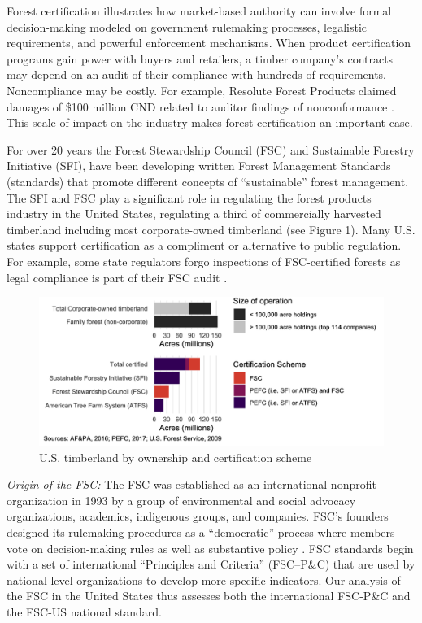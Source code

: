 \documentclass[
      12pt,
            Review ]{article}
\begin{document}
Forest certification illustrates how market-based authority can involve formal decision-making modeled on government rulemaking processes, legalistic requirements, and powerful enforcement mechanisms. When product certification programs gain power with buyers and retailers, a timber company's contracts may depend on an audit of their compliance with hundreds of requirements. Noncompliance may be costly. For example, Resolute Forest Products claimed damages of \$100 million CND related to auditor findings of nonconformance \citep{Tigar2017}. This scale of impact on the industry makes forest certification an important case.

For over 20 years the Forest Stewardship Council (FSC) and Sustainable Forestry Initiative (SFI), have been developing written Forest Management Standards (standards) that promote different concepts of ``sustainable'' forest management. The SFI and FSC play a significant role in regulating the forest products industry in the United States, regulating a third of commercially harvested timberland including most corporate-owned timberland (see Figure 1). Many U.S. states support certification as a compliment or alternative to public regulation. For example, some state regulators forgo inspections of FSC-certified forests as legal compliance is part of their FSC audit \citep{Judge-Lord2013}.

\begin{figure}
\centering
\includegraphics{../Figs/acres-1.png}
\caption{U.S. timberland by ownership and certification scheme}
\end{figure}

\emph{Origin of the FSC:} The FSC was established as an international nonprofit organization in 1993 by a group of environmental and social advocacy organizations, academics, indigenous groups, and companies. FSC's founders designed its rulemaking procedures as a ``democratic'' process where members vote on decision-making rules as well as substantive policy \citep{Meidinger2003}. FSC standards begin with a set of international ``Principles and Criteria'' (FSC--P\&C) that are used by national-level organizations to develop more specific indicators. Our analysis of the FSC in the United States thus assesses both the international FSC-P\&C and the FSC-US national standard.
\end{document}
